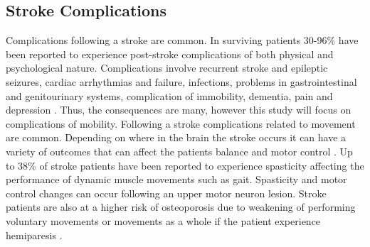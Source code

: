 \subsection{Stroke Complications}
Complications following a stroke are common. In surviving patients 30-96\% have been reported to experience post-stroke complications of both physical and psychological nature. Complications involve recurrent stroke and epileptic seizures, cardiac arrhythmias and failure, infections, problems in gastrointestinal and genitourinary systems, complication of immobility, dementia, pain and depression \cite{Bhalla2016}. %
Thus, the consequences are many, however this study will focus on complications of mobility. Following a stroke complications related to movement are common. Depending on where in the brain the stroke occurs it can have a variety of outcomes that can affect the patients balance and motor control \cite{Zehr2011}. Up to 38\% of stroke patients have been reported to experience spasticity affecting the performance of dynamic muscle movements such as gait. Spasticity and motor control changes can occur following an upper motor neuron lesion.%
Stroke patients are also at a higher risk of osteoporosis due to weakening of performing voluntary movements or movements as a whole if the patient experience hemiparesis \cite{Bhalla2016,Zehr2011}.
